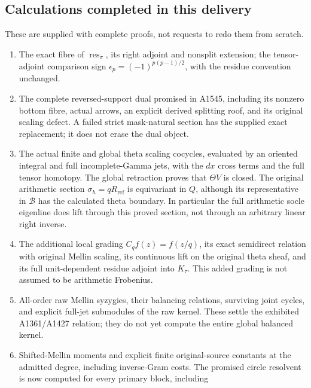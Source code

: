 \documentclass[10pt,a4paper,oneside]{report}
\providecommand{\tightlist}{\setlength{\itemsep}{0pt}\setlength{\parskip}{0pt}}
\begin{document}
\subsection{Calculations completed in this
delivery}\label{calculations-completed-in-this-delivery}

These are supplied with complete proofs, not requests to redo them from
scratch.

\begin{enumerate}
\def\labelenumi{\arabic{enumi}.}
\tightlist
\item
  The exact fibre of \(\operatorname{res}_\sigma\), its right adjoint
  and nonsplit extension; the tensor-adjoint comparison sign
  \(\epsilon_p=(-1)^{p(p-1)/2}\), with the residue convention unchanged.
\item
  The complete reversed-support dual promised in A1545, including its
  nonzero bottom fibre, actual arrows, an explicit derived splitting
  roof, and its original scaling defect. A failed strict mask-natural
  section has the supplied exact replacement; it does not erase the dual
  object.
\item
  The actual finite and global theta scaling cocycles, evaluated by an
  oriented integral and full incomplete-Gamma jets, with the \(dx\)
  cross terms and the full tensor homotopy. The global retraction proves
  that \(\Theta V\) is closed. The original arithmetic section
  \(\sigma_h=qR_{\mathrm{ref}}\) is equivariant in \(Q\), although its
  representative in \(\mathscr B\) has the calculated theta boundary. In
  particular the full arithmetic socle eigenline does lift through this
  proved section, not through an arbitrary linear right inverse.
\item
  The additional local grading \(C_qf(z)=f(z/q)\), its exact semidirect
  relation with original Mellin scaling, its continuous lift on the
  original theta sheaf, and its full unit-dependent residue adjoint into
  \(K_\tau\). This added grading is not assumed to be arithmetic
  Frobenius.
\item
  All-order raw Mellin syzygies, their balancing relations, surviving
  joint cycles, and explicit full-jet submodules of the raw kernel.
  These settle the exhibited A1361/A1427 relation; they do not yet
  compute the entire global balanced kernel.
\item
  Shifted-Mellin moments and explicit finite original-source constants
  at the admitted degree, including inverse-Gram costs. The promised
  circle resolvent is now computed for every primary block, including

\end{enumerate}
\end{document}
